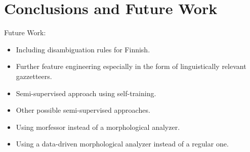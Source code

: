 \chapter{Conclusions and Future Work}
\label{chapter:conclusions}
Future Work:
\begin{itemize}
\item Including disambiguation rules for Finnish.
\item Further feature engineering especially in the form of
  linguistically relevant gazzetteers.
\item Semi-supervised approach using self-training.
\item Other possible semi-supervised approaches.
\item Using morfessor instead of a morphological analyzer.
\item Using a data-driven morphological analyzer instead of a regular
  one.
\end{itemize}